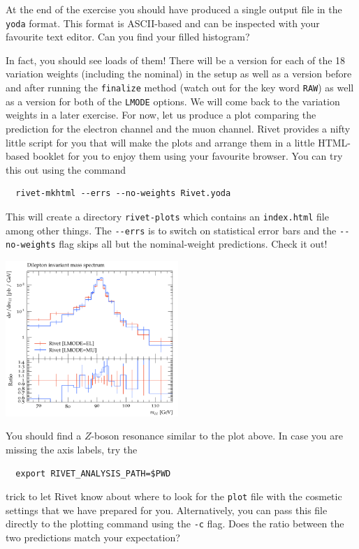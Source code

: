 \documentclass[10pt,fleqn]{scrartcl}
\theoremstyle{exstyle}
\begin{document}
At the end of the exercise you should have produced a single output file 
in the \verb|yoda| format. This format is ASCII-based and can be inspected
with your favourite text editor. Can you find your filled histogram?

In fact, you should see loads of them! There will be a version for each of
the 18 variation weights (including the nominal) in the setup as well
as a version before and after running the \verb|finalize| method 
(watch out for the key word \verb|RAW|) as well as a version
for both of the \verb|LMODE| options. 
We will come back to the variation weights in a later exercise.
For now, let us produce a plot comparing the prediction for the 
electron channel and the muon channel. 
Rivet provides a nifty little script for you that will make the
plots and arrange them in a little HTML-based booklet 
for you to enjoy them using your favourite browser.
You can try this out using the command
\begin{verbatim}
  rivet-mkhtml --errs --no-weights Rivet.yoda
\end{verbatim}
This will create a directory \verb|rivet-plots| which contains
an \verb|index.html| file among other things. 
The \verb|--errs| is to switch on statistical error bars
and the \verb|--no-weights| flag skips all but the nominal-weight predictions.
Check it out!

\begin{center}
\includegraphics[width=0.49\textwidth]{figures/mass_ll.pdf}
\end{center}

You should find a $Z$-boson resonance similar to the plot above. 
In case you are missing the axis labels, try the
\begin{verbatim}
  export RIVET_ANALYSIS_PATH=$PWD
\end{verbatim}
trick to let Rivet know about where to look for the \verb|plot| file with the 
cosmetic settings that we have prepared for you. 
Alternatively, you can pass this file directly to the
plotting command using the \verb|-c| flag.
Does the ratio between the two predictions match your expectation?
\end{document}
